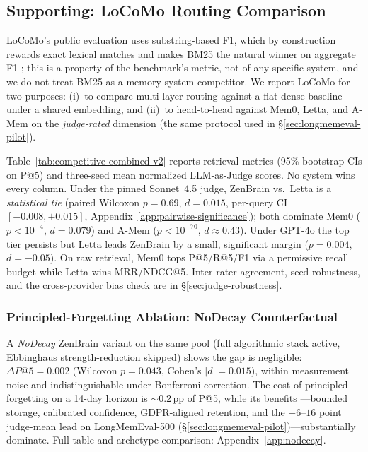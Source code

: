 \documentclass{article}
\begin{document}
\subsection{Supporting: LoCoMo Routing Comparison}
\label{sec:real-locomo}

LoCoMo's public evaluation uses substring-based F1, which by
construction rewards exact lexical matches and makes BM25 the natural
winner on aggregate F1 \citep{maharana2024locomo}; this is a property
of the benchmark's metric, not of any specific system, and we do not
treat BM25 as a memory-system competitor. We report LoCoMo for two
purposes: (i)~to compare multi-layer routing against a flat dense
baseline under a shared embedding, and (ii)~to head-to-head against
Mem0, Letta, and A-Mem on the
\emph{judge-rated} dimension (the same protocol used in
\S\ref{sec:longmemeval-pilot}).

Table~\ref{tab:competitive-combined-v2} reports retrieval metrics
(95\% bootstrap CIs on P@5) and three-seed mean normalized LLM-as-Judge
scores. No system wins every column. Under the pinned Sonnet~4.5
judge, ZenBrain vs.\ Letta is a \emph{statistical tie} (paired
Wilcoxon $p=0.69$, $d=0.015$, per-query CI $[-0.008,+0.015]$,
Appendix~\ref{app:pairwise-significance}); both dominate Mem0
($p<10^{-4}$, $d=0.079$) and A-Mem
($p<10^{-70}$, $d\approx 0.43$). Under GPT-4o the top tier persists
but Letta leads ZenBrain by a small, significant margin
($p=0.004$, $d=-0.05$). On raw retrieval, Mem0 tops P@5/R@5/F1
via a permissive recall budget while Letta wins MRR/NDCG@5.
Inter-rater agreement, seed robustness, and the cross-provider bias
check are in \S\ref{sec:judge-robustness}.



\subsubsection{Principled-Forgetting Ablation: NoDecay Counterfactual}
\label{sec:nodecay-ablation}

A \emph{NoDecay} ZenBrain variant on the same pool (full algorithmic
stack active, Ebbinghaus strength-reduction skipped) shows the gap is
negligible: $\Delta P@5 = 0.002$ (Wilcoxon $p = 0.043$,
Cohen's $|d| = 0.015$), within measurement noise and indistinguishable
under Bonferroni correction. The cost of principled forgetting on a
14-day horizon is $\sim 0.2$\,pp of P@5, while its benefits
---bounded storage, calibrated confidence, GDPR-aligned retention,
and the $+6$--$16$ point judge-mean lead on LongMemEval-500
(\S\ref{sec:longmemeval-pilot})---substantially dominate.
Full table and archetype comparison: Appendix~\ref{app:nodecay}.
\end{document}
